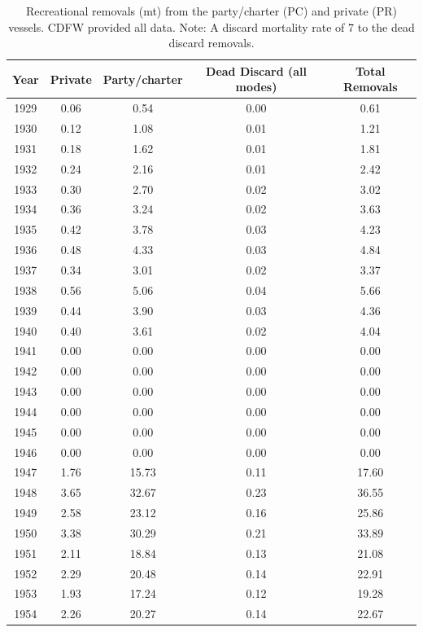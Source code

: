 \documentclass[12pt,]{article}
\begin{document}
\begin{longtable}{ccccc}
\caption{Recreational removals (mt) from the party/charter 
                                        (PC) and private (PR) vessels. CDFW provided all 
                                        data. Note: A discard mortality rate of 7%
                                          to the dead discard removals.} \\ 
  \hline
Year & Private & Party/charter & Dead Discard (all modes) & Total Removals \\ 
  \hline \endhead  \hline
1929 & 0.06 & 0.54 & 0.00 & 0.61 \\ 
  1930 & 0.12 & 1.08 & 0.01 & 1.21 \\ 
  1931 & 0.18 & 1.62 & 0.01 & 1.81 \\ 
  1932 & 0.24 & 2.16 & 0.01 & 2.42 \\ 
  1933 & 0.30 & 2.70 & 0.02 & 3.02 \\ 
  1934 & 0.36 & 3.24 & 0.02 & 3.63 \\ 
  1935 & 0.42 & 3.78 & 0.03 & 4.23 \\ 
  1936 & 0.48 & 4.33 & 0.03 & 4.84 \\ 
  1937 & 0.34 & 3.01 & 0.02 & 3.37 \\ 
  1938 & 0.56 & 5.06 & 0.04 & 5.66 \\ 
  1939 & 0.44 & 3.90 & 0.03 & 4.36 \\ 
  1940 & 0.40 & 3.61 & 0.02 & 4.04 \\ 
  1941 & 0.00 & 0.00 & 0.00 & 0.00 \\ 
  1942 & 0.00 & 0.00 & 0.00 & 0.00 \\ 
  1943 & 0.00 & 0.00 & 0.00 & 0.00 \\ 
  1944 & 0.00 & 0.00 & 0.00 & 0.00 \\ 
  1945 & 0.00 & 0.00 & 0.00 & 0.00 \\ 
  1946 & 0.00 & 0.00 & 0.00 & 0.00 \\ 
  1947 & 1.76 & 15.73 & 0.11 & 17.60 \\ 
  1948 & 3.65 & 32.67 & 0.23 & 36.55 \\ 
  1949 & 2.58 & 23.12 & 0.16 & 25.86 \\ 
  1950 & 3.38 & 30.29 & 0.21 & 33.89 \\ 
  1951 & 2.11 & 18.84 & 0.13 & 21.08 \\ 
  1952 & 2.29 & 20.48 & 0.14 & 22.91 \\ 
  1953 & 1.93 & 17.24 & 0.12 & 19.28 \\ 
  1954 & 2.26 & 20.27 & 0.14 & 22.67 \\ 

\end{longtable}
\end{document}
